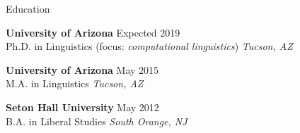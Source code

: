 \documentclass{resume} %
\begin{document}
\vspace{.5cm}
\begin{rSection}{Education}

{\bf University of Arizona} \hfill {Expected 2019} \\ 
Ph.D. in Linguistics (focus: \textit{computational linguistics}) \hfill {\em Tucson, AZ}

\vspace{.15cm}

{\bf University of Arizona} \hfill {May 2015} \\ 
M.A. in Linguistics \hfill {\em Tucson, AZ}

\vspace{.15cm}

{\bf Seton Hall University} \hfill {May 2012} \\ 
B.A. in Liberal Studies  \hfill {\em South Orange, NJ} \\



\end{rSection}


\vspace{.25cm}
\end{document}

